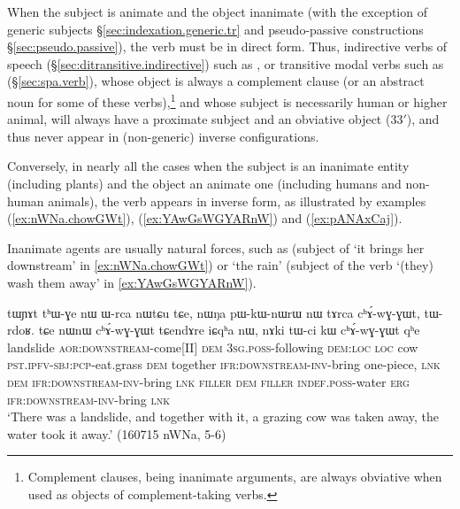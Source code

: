 When the subject is animate and the object inanimate (with the exception of generic subjects §\ref{sec:indexation.generic.tr} and pseudo-passive constructions §\ref{sec:pseudo.passive}), the verb must be in direct form. Thus, indirective verbs of speech (§\ref{sec:ditransitive.indirective}) such as , or transitive modal verbs such as  (§\ref{sec:spa.verb}), whose object is always a complement clause (or an abstract noun for some of these verbs),\footnote{Complement clauses, being inanimate arguments, are always obviative when used as objects of complement-taking verbs. } and whose subject is necessarily human or higher animal, will always have a proximate subject and an obviative object (3\fl{}3$'$), and thus never appear in (non-generic) inverse configurations. 

Conversely, in nearly all the cases when the subject is an inanimate entity (including plants) and the object an animate one (including humans and non-human animals), the verb appears in inverse form, as illustrated by examples (\ref{ex:nWNa.chowGWt}), (\ref{ex:YAwGsWGYARnW}) and (\ref{ex:pANAxCaj}). 

Inanimate agents are usually natural forces, such as  (subject of  `it brings her downstream' in \ref{ex:nWNa.chowGWt}) or  `the rain'  (subject of the verb  `(they) wash them away' in \ref{ex:YAwGsWGYARnW}).   
 
\begin{exe}
\ex \label{ex:nWNa.chowGWt} 
\gll tɯɲɤt tʰɯ-ɣe nɯ ɯ-rca nɯtɕu tɕe, nɯŋa pɯ-kɯ-nɯrɯ nɯ tɤrca cʰɤ́-wɣ-ɣɯt, tɯ-rdoʁ. tɕe nɯnɯ cʰɤ́-wɣ-ɣɯt tɕendɤre iɕqʰa nɯ, nɤki tɯ-ci kɯ cʰɤ́-wɣ-ɣɯt qʰe \\
landslide \textsc{aor}:\textsc{downstream}-come[II] \textsc{dem} \textsc{3sg}.\textsc{poss}-following \textsc{dem}:\textsc{loc} \textsc{loc} cow  \textsc{pst}.\textsc{ipfv}-\textsc{sbj}:\textsc{pcp}-eat.grass \textsc{dem} together \textsc{ifr}:\textsc{downstream}-\textsc{inv}-bring one-piece, \textsc{lnk} \textsc{dem} \textsc{ifr}:\textsc{downstream}-\textsc{inv}-bring \textsc{lnk} \textsc{filler} \textsc{dem} \textsc{filler} \textsc{indef}.\textsc{poss}-water \textsc{erg} \textsc{ifr}:\textsc{downstream}-\textsc{inv}-bring  \textsc{lnk} \\
\glt `There was a landslide, and together with it, a grazing cow was taken away, the water took it away.' (160715 nWNa, 5-6)
\end{exe}

